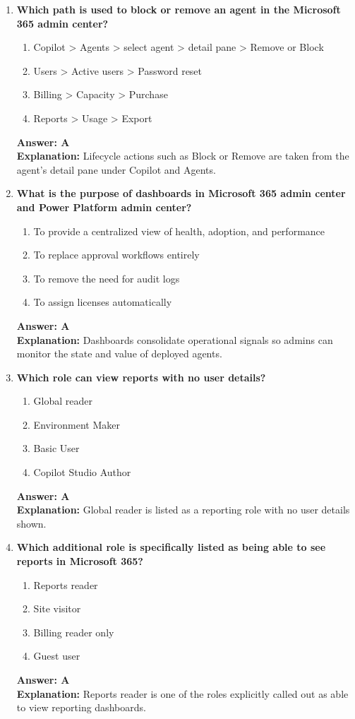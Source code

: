 \documentclass[10pt]{article}
\begin{document}
\begin{enumerate}[leftmargin=*]
\item \textbf{Which path is used to block or remove an agent in the Microsoft 365 admin center?}
\begin{enumerate}[label=\Alph*.]
  \item Copilot > Agents > select agent > detail pane > Remove or Block
  \item Users > Active users > Password reset
  \item Billing > Capacity > Purchase
  \item Reports > Usage > Export
\end{enumerate}
\textbf{Answer: A}\\
\textbf{Explanation:} Lifecycle actions such as Block or Remove are taken from the agent's detail pane under Copilot and Agents.

\item \textbf{What is the purpose of dashboards in Microsoft 365 admin center and Power Platform admin center?}
\begin{enumerate}[label=\Alph*.]
  \item To provide a centralized view of health, adoption, and performance
  \item To replace approval workflows entirely
  \item To remove the need for audit logs
  \item To assign licenses automatically
\end{enumerate}
\textbf{Answer: A}\\
\textbf{Explanation:} Dashboards consolidate operational signals so admins can monitor the state and value of deployed agents.

\item \textbf{Which role can view reports with no user details?}
\begin{enumerate}[label=\Alph*.]
  \item Global reader
  \item Environment Maker
  \item Basic User
  \item Copilot Studio Author
\end{enumerate}
\textbf{Answer: A}\\
\textbf{Explanation:} Global reader is listed as a reporting role with no user details shown.

\item \textbf{Which additional role is specifically listed as being able to see reports in Microsoft 365?}
\begin{enumerate}[label=\Alph*.]
  \item Reports reader
  \item Site visitor
  \item Billing reader only
  \item Guest user
\end{enumerate}
\textbf{Answer: A}\\
\textbf{Explanation:} Reports reader is one of the roles explicitly called out as able to view reporting dashboards.


\end{enumerate}
\end{document}

